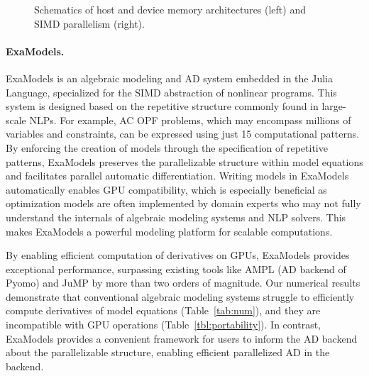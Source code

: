 \begin{figure}[t]
{
}
\vspace{-.075in}
\caption{Schematics of host and device memory architectures (left) and SIMD parallelism (right).}
\vspace{-.075in}
\label{fig:simd}
\end{figure}


\paragraph{ExaModels.}

ExaModels is an algebraic modeling and AD system embedded in the Julia
Language, specialized for the SIMD abstraction of nonlinear
programs. This system is designed based on the repetitive structure
commonly found in large-scale NLPs. For example, AC OPF problems,
which may encompass millions of variables and constraints, can be expressed
using just 15 computational patterns. By enforcing the creation of
models through the specification of repetitive patterns, ExaModels preserves the
parallelizable structure within model equations and facilitates
parallel automatic differentiation. Writing models in ExaModels
automatically enables GPU compatibility, which is especially
beneficial as optimization models are often implemented by domain
experts who may not fully understand the internals of algebraic
modeling systems and NLP solvers.  This makes ExaModels a powerful
modeling platform for scalable computations.


By enabling efficient computation of derivatives on GPUs, ExaModels
provides exceptional performance, surpassing existing tools like AMPL
(AD backend of Pyomo) and JuMP by more than two orders of
magnitude. Our numerical results demonstrate that conventional
algebraic modeling systems struggle to efficiently compute derivatives
of model equations (Table~\ref{tab:num}), and they are incompatible
with GPU operations (Table~\ref{tbl:portability}). In contrast,
ExaModels provides a convenient framework for users to inform the AD
backend about the parallelizable structure, enabling efficient
parallelized AD in the backend.


